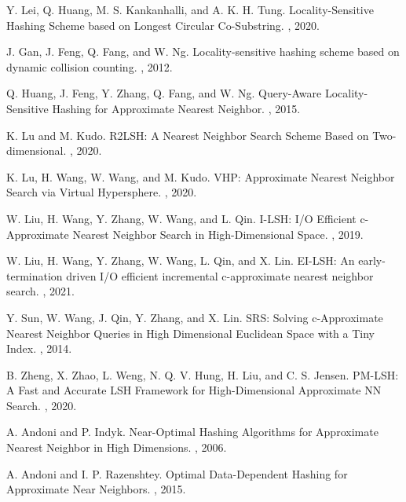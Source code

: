 \documentclass[11pt]{article}
\begin{document}
\begin{thebibliography}{10}
\begin{small}
Y. Lei, Q. Huang, M. S. Kankanhalli, and A. K. H. Tung.
\newblock Locality-Sensitive Hashing Scheme based on Longest Circular Co-Substring.
, 2020.


J. Gan, J. Feng, Q. Fang, and W. Ng.
\newblock Locality-sensitive hashing scheme based on dynamic collision counting.
, 2012.


Q. Huang, J. Feng, Y. Zhang, Q. Fang, and W. Ng.
\newblock Query-Aware Locality-Sensitive Hashing for Approximate Nearest Neighbor.
, 2015.

K. Lu and M. Kudo.
\newblock R2LSH: A Nearest Neighbor Search Scheme Based on Two-dimensional.
, 2020.

K. Lu, H. Wang, W. Wang, and M. Kudo.
\newblock VHP: Approximate Nearest Neighbor Search via Virtual Hypersphere.
, 2020.


W. Liu, H. Wang, Y. Zhang, W. Wang, and L. Qin.
\newblock I-LSH: I/O Efficient c-Approximate Nearest Neighbor Search in High-Dimensional Space.
, 2019.


W. Liu, H. Wang, Y. Zhang, W. Wang, L. Qin, and X. Lin.
\newblock EI-LSH: An early-termination driven {I/O} efficient incremental c-approximate nearest neighbor search.
, 2021.

Y. Sun, W. Wang, J. Qin, Y. Zhang, and X. Lin.
\newblock SRS: Solving c-Approximate Nearest Neighbor Queries in High Dimensional Euclidean Space with a Tiny Index.
, 2014.



B. Zheng, X. Zhao, L. Weng, N. Q. V. Hung, H. Liu, and C. S. Jensen.
\newblock PM-LSH: A Fast and Accurate LSH Framework for High-Dimensional Approximate NN Search.
, 2020.

A. Andoni and P. Indyk.
\newblock Near-Optimal Hashing Algorithms for Approximate Nearest Neighbor in High Dimensions.
, 2006.

A. Andoni and I. P. Razenshtey.
\newblock Optimal Data-Dependent Hashing for Approximate Near Neighbors.
, 2015.


\end{small}
\end{thebibliography}
\end{document}
